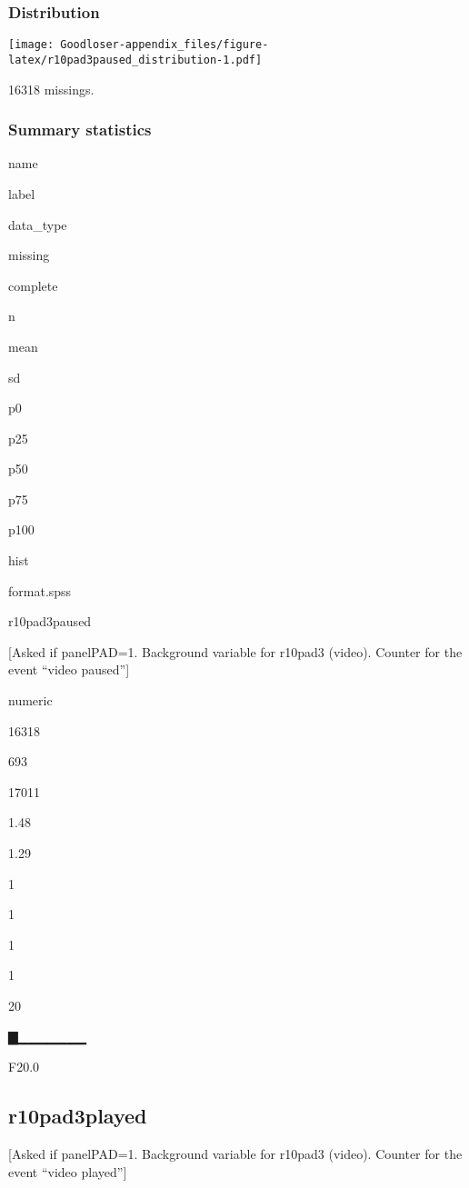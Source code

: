 \documentclass[]{book}
\begin{document}
\subsubsection{Distribution}\label{r10pad3paused_distribution}

\texttt{[image: Goodloser-appendix\_files/figure-latex/r10pad3paused\_distribution-1.pdf]}

16318 missings.

\subsubsection{Summary statistics}\label{r10pad3paused_summary}

name

label

data\_type

missing

complete

n

mean

sd

p0

p25

p50

p75

p100

hist

format.spss

r10pad3paused

{[}Asked if panelPAD=1. Background variable for r10pad3 (video). Counter
for the event ``video paused''{]}

numeric

16318

693

17011

1.48

1.29

1

1

1

1

20

▇▁▁▁▁▁▁▁

F20.0

\subsection{r10pad3played}\label{r10pad3played}

{[}Asked if panelPAD=1. Background variable for r10pad3 (video). Counter
for the event ``video played''{]}
\end{document}
